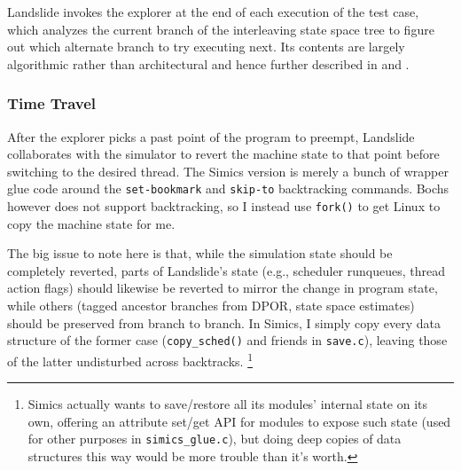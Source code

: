 Landslide invokes the explorer at the end of each execution of the test case,
which analyzes the current branch of the interleaving state space tree
to figure out which alternate branch to try executing next.
Its contents are largely algorithmic rather than architectural
and hence further described in \sect{\ref{sec:landslide-dpor}} and \sect{\ref{sec:landslide-icb}}.

\subsubsection{Time Travel}
\label{sec:landslide-timetravel}

After the explorer picks a past point of the program to preempt, %
Landslide collaborates with the simulator to revert the machine state to that point before switching to the desired thread.
The Simics version is merely a bunch of wrapper glue code around the {\tt set-bookmark} and {\tt skip-to} backtracking commands.
Bochs however does not support backtracking, so I instead use {\tt fork()} to get Linux to copy the machine state for me.

The big issue to note here is that, while the simulation state should be completely reverted,
parts of Landslide's state (e.g., scheduler runqueues, thread action flags)
should likewise be reverted to mirror the change in program state,
while others (tagged ancestor branches from DPOR, state space estimates) should be preserved from branch to branch.
In Simics, I simply copy every data structure of the former case ({\tt copy\_sched()} and friends in {\tt save.c}),
leaving those of the latter undisturbed across backtracks.%
\footnote{Simics actually wants to save/restore all its modules' internal state on its own,
offering an attribute set/get API for modules to expose such state (used for other purposes in {\tt simics\_glue.c}),
but doing deep copies of data structures this way would be more trouble than it's worth.}

